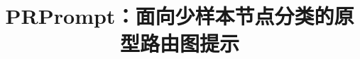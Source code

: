 \documentclass[10pt,twocolumn,fontset=none]{ctexart}
\title{PRPrompt：面向少样本节点分类的原型路由图提示}
\author{}
\date{}
\begin{document}
\maketitle

\FloatBarrier
\begingroup
\footnotesize
\raggedright


\endgroup
\appendix
\small

\end{document}
